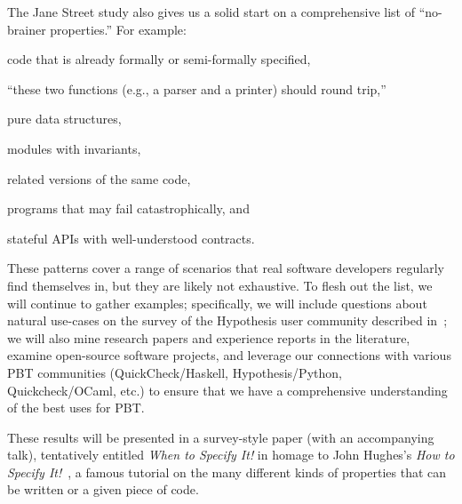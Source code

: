 The Jane Street study also gives us a solid start on a comprehensive list of
``no-brainer properties.''  For example:
\begin{enumerate*}[label=(1)]
\item code that is already formally or semi-formally specified,
\item ``these two functions (e.g., a parser and a printer) should
round trip,'' 
\item pure data structures,
\item modules with invariants,
\item related versions of the same code,
\item programs that may fail catastrophically,
and
\item stateful APIs with well-understood contracts.
\end{enumerate*}
These patterns cover a range of
scenarios that real software developers regularly find themselves in, but they
are likely not exhaustive. To flesh out the list, we will continue to
gather examples; specifically, we will include
questions about natural use-cases on the survey of the Hypothesis user
community described in~; we will also mine
research papers and experience reports in the literature,
examine open-source software projects, and leverage our connections with various
PBT communities (QuickCheck/Haskell, Hypothesis/Python, Quickcheck/OCaml, etc.)
to ensure that we have a comprehensive understanding of the best uses for PBT.

These results will be presented in a survey-style paper (with an
accompanying talk), tentatively entitled {\em When to Specify It!} in
homage to John Hughes's {\em How to Specify
  It!}~\cite{HowToSpecifyIt}, a famous tutorial on the many different
kinds of properties that can be written or a given piece of code.


%

